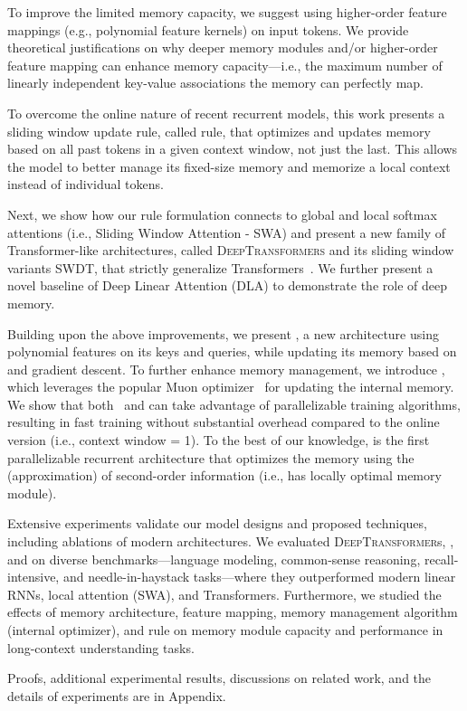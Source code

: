 To improve the limited memory capacity, we suggest using higher-order feature mappings (e.g., polynomial feature kernels) on input tokens. We provide theoretical justifications on why deeper memory modules and/or higher-order feature mapping can enhance memory capacity—i.e., the maximum number of linearly independent key-value associations the memory can perfectly map.

To overcome the online nature of recent recurrent models, this work presents a sliding window update rule, called \learningrule{} rule, that optimizes and updates memory based on all past tokens in a given context window, not just the last. This allows the model to better manage its fixed-size memory and memorize a local context instead of individual tokens. 

 Next, we show how our \learningrule{} rule formulation connects to global and local softmax attentions (i.e., Sliding Window Attention - SWA) and present a new family of Transformer-like architectures, called \textsc{DeepTransformers} and its sliding window variants SWDT, that strictly generalize Transformers~\citep{transformers}. We further present a novel baseline of Deep Linear Attention (DLA) to demonstrate the role of deep memory.


Building upon the above improvements, we present \omodel{}, a new architecture using polynomial features on its keys and queries, while updating its memory based on  \learningrule{} and gradient descent. To further enhance memory management, we introduce \model{}, which leverages the popular Muon optimizer~\citep{jordan2024muon} for updating the internal memory. We show that both \omodel~and \model{} can take advantage of parallelizable training algorithms, resulting in fast training without substantial overhead compared to the online version (i.e., context window = 1). To the best of our knowledge, \model{} is the first parallelizable recurrent architecture that optimizes the memory using the (approximation) of second-order information (i.e., has locally optimal memory module).


Extensive experiments validate our model designs and proposed techniques, including ablations of modern architectures. We evaluated \textsc{DeepTransformer}s, \omodel{}, and \model{} on diverse benchmarks—language modeling, common-sense reasoning, recall-intensive, and needle-in-haystack tasks—where they outperformed modern linear RNNs, local attention (SWA), and Transformers. Furthermore, we studied the effects of memory architecture, feature mapping, memory management algorithm (internal optimizer), and  \learningrule{} rule on memory module capacity and performance in long-context understanding tasks.




Proofs, additional experimental results, discussions on related work, and the details of experiments are in Appendix.